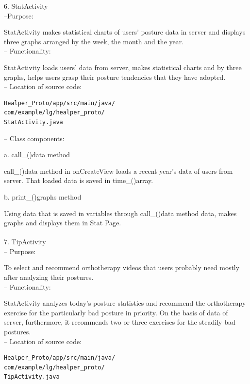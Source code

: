 \documentclass[conference]{IEEEtran}
\begin{document}
6.	StatActivity\\

 --Purpose:

StatActivity makes statistical charts of users' posture data in server and displays three graphs arranged by the week, the month and the year. \\

 --	Functionality:

StatActivity loads users' data from server, makes statistical charts and by three graphs, helps users grasp their posture tendencies that they have adopted. \\

 --	Location of source code:
 
\begin{verbatim}
Healper_Proto/app/src/main/java/
com/example/lg/healper_proto/
StatActivity.java
 \end{verbatim}
 
 --	Class components:
 
a. call\_()data method 

call\_()data method in onCreateView loads a recent year's data of users from server. That loaded data is saved in time\_()array.  

b. print\_()graphs method 

Using data that is saved in variables through call\_()data method data, makes graphs and displays them in Stat Page.\\\\

7.	TipActivity\\

 --	Purpose:

To select and recommend orthotherapy videos that users probably need mostly after analyzing their postures. \\

 --	Functionality:

StatActivity analyzes today's posture statistics and recommend the orthotherapy exercise for the particularly bad posture in priority. On the basis of data of server, furthermore, it recommends two or three exercises for the steadily bad postures. \\

 --	Location of source code:
 
\begin{verbatim} 
Healper_Proto/app/src/main/java/
com/example/lg/healper_proto/
TipActivity.java
\end{verbatim}
\end{document}
